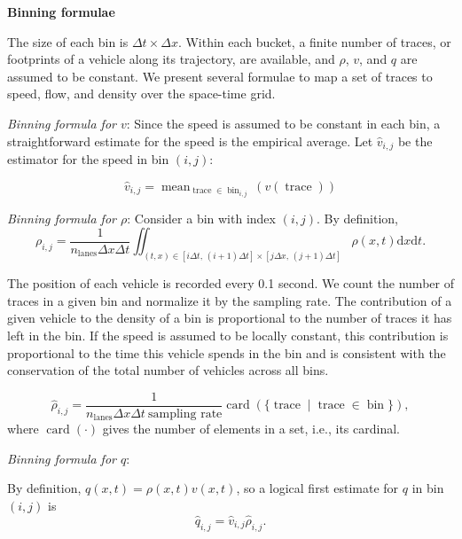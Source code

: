 \documentclass[preprint]{elsarticle}
\DeclareMathOperator{\card}{card}
\DeclareMathOperator{\trc}{trace}
\DeclareMathOperator{\mean}{mean}
\DeclareMathOperator{\bin}{bin}
\DeclareMathOperator{\lns}{lanes}
\begin{document}
\noindent \textbf{Binning formulae}

The size of each bin is $\Delta t\times\Delta x$. Within each bucket, a finite number of traces, or footprints of a vehicle along its trajectory, are available, and $\rho$, $v$, and $q$ are assumed to be constant. We present several formulae to map a set of traces to speed, flow, and density over the space-time grid. 

\textit{Binning formula for $v$}: Since the speed is assumed to be constant in each bin, a straightforward estimate for the speed is the empirical average. Let $\widehat{v}_{i,j}$ be the estimator for the speed in bin $(i,j)$:

\begin{equation}
\widehat{v}_{i,j}=\mean_{\trc \in \bin_{i,j}}(v(\trc))
\end{equation}

\textit{Binning formula for $\rho$}: Consider a bin with index $(i,j)$. By definition, 
\begin{equation}
\rho_{i,j}=\frac{1}{n_{\lns}\Delta x\Delta t}\iint_{\left(t,x\right)\in [i\Delta t, \,(i+1)\Delta t] \times [j\Delta x,\,(j+1)\Delta t]}\rho(x,t) \text{d}x \text{d}t.
\end{equation}

The position of each vehicle is recorded every 0.1 second. We count the number of traces in a given bin and normalize it by the sampling rate. The contribution of a given vehicle to the density of a bin is proportional to the
number of traces it has left in the bin. If the speed is assumed to be locally constant, this contribution is proportional to the time this vehicle spends in the bin and is consistent with the conservation of the total number of vehicles across all bins.

\begin{equation}
\widehat{\rho}_{i,j}=\frac{1}{n_{\lns} \Delta x \Delta t \: \text{sampling rate}}\card ( \{ \trc \mid \trc \in \bin \} ),
\end{equation}
where $\card (\cdot)$ gives the number of elements in a set, i.e., its cardinal.

\textit{Binning formula for $q$}:

By definition, $q\left(x,t\right)=\rho\left(x,t\right)v\left(x,t\right)$, so a logical first estimate for $q$ in bin $(i,j)$ is 
\begin{equation}
\widehat{q}_{i,j}=\widehat{v}_{i,j}\widehat{\rho}_{i,j}.
\end{equation}
\end{document}
